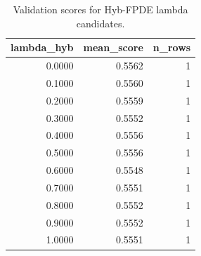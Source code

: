 \begin{table}[t]
\caption{Validation scores for Hyb-FPDE lambda candidates.}
\label{tab:lambda_distribution_computed}
\centering
\begin{tabular}{rrr}
\toprule
lambda\_hyb & mean\_score & n\_rows \\
\midrule
0.0000 & 0.5562 & 1 \\
0.1000 & 0.5560 & 1 \\
0.2000 & 0.5559 & 1 \\
0.3000 & 0.5552 & 1 \\
0.4000 & 0.5556 & 1 \\
0.5000 & 0.5556 & 1 \\
0.6000 & 0.5548 & 1 \\
0.7000 & 0.5551 & 1 \\
0.8000 & 0.5552 & 1 \\
0.9000 & 0.5552 & 1 \\
1.0000 & 0.5551 & 1 \\
\bottomrule
\end{tabular}

\end{table}
